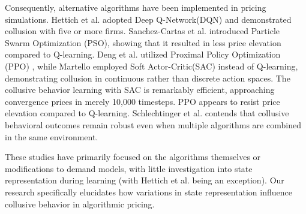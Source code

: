 \documentclass[runningheads]{llncs}
\begin{document}
Consequently, alternative algorithms have been implemented in pricing simulations. Hettich et al. \cite{hettich2021} adopted Deep Q-Network(DQN) \cite{mnih2013} and demonstrated collusion with five or more firms. Sanchez-Cartas et al. \cite{Sanchez-Cartas2022} introduced Particle Swarm Optimization (PSO), showing that it resulted in less price elevation compared to Q-learning. Deng et al. \cite{deng2024algorithmic} utilized Proximal Policy Optimization (PPO) \cite{schulman2017proximal}, while Martello \cite{martello2022autonomous} employed Soft Actor-Critic(SAC) \cite{haarnoja2018soft} instead of Q-learning, demonstrating collusion in continuous rather than discrete action spaces. The collusive behavior learning with SAC is remarkably efficient, approaching convergence prices in merely 10,000 timesteps. PPO appears to resist price elevation compared to Q-learning. Schlechtinger et al. \cite{Schlechtinger2024} contends that collusive behavioral outcomes remain robust even when multiple algorithms are combined in the same environment.

These studies have primarily focused on the algorithms themselves or modifications to demand models, with little investigation into state representation during learning (with Hettich et al. being an exception). Our research specifically elucidates how variations in state representation influence collusive behavior in algorithmic pricing.


\end{document}
